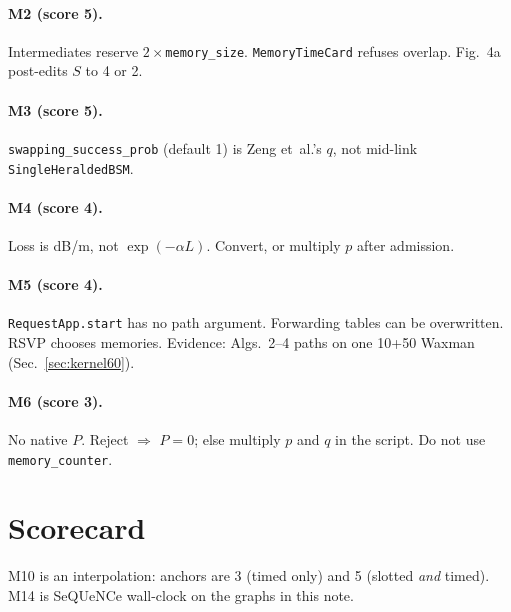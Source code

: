 \documentclass[11pt]{article}
\begin{document}
\paragraph{M2 (score 5).}
Intermediates reserve $2\times$\texttt{memory\_size}.
\texttt{MemoryTimeCard} refuses overlap.
Fig.~4a post-edits $S$ to 4 or 2.

\paragraph{M3 (score 5).}
\texttt{swapping\_success\_prob} (default 1) is Zeng et~al.'s $q$, not mid-link \texttt{SingleHeraldedBSM}.

\paragraph{M4 (score 4).}
Loss is dB/m, not $\exp(-\alpha L)$.
Convert, or multiply $p$ after admission.

\paragraph{M5 (score 4).}
\texttt{RequestApp.start} has no path argument.
Forwarding tables can be overwritten.
RSVP chooses memories.
Evidence: Algs.~2--4 paths on one 10+50 Waxman (Sec.~\ref{sec:kernel60}).

\paragraph{M6 (score 3).}
No native $P$.
Reject $\Rightarrow$ $P=0$; else multiply $p$ and $q$ in the script.
Do not use \texttt{memory\_counter}.

\section{Scorecard}

M10 is an interpolation: anchors are 3 (timed only) and 5 (slotted \emph{and} timed).
M14 is SeQUeNCe wall-clock on the graphs in this note.
\end{document}
